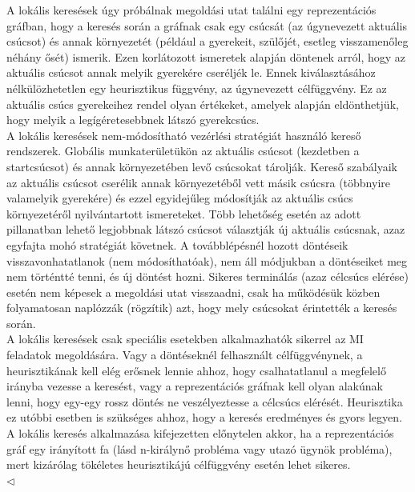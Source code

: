 \documentclass[12pt,margin=0px]{article}
\begin{document}
    {\footnotesize
    \noindent {\color{blue} \faLightbulbO\ $\triangleright$ }

    {\footnotesize
    \noindent A lokális keresések úgy próbálnak megoldási utat találni egy reprezentációs gráfban, hogy a keresés során a gráfnak csak egy csúcsát (az úgynevezett aktuális csúcsot) és annak környezetét (például a gyerekeit, szülőjét, esetleg visszamenőleg néhány ősét) ismerik. Ezen korlátozott ismeretek alapján döntenek arról, hogy az aktuális csúcsot annak melyik gyerekére cseréljék le. Ennek kiválasztásához nélkülözhetetlen egy heurisztikus függvény, az úgynevezett célfüggvény. Ez az aktuális csúcs gyerekeihez rendel olyan értékeket, amelyek alapján eldönthetjük, hogy melyik a legígéretesebbnek látszó gyerekcsúcs.
    }\\

    {\footnotesize
    \noindent A lokális keresések nem-módosítható vezérlési stratégiát használó kereső rendszerek. Globális munkaterületükön az aktuális csúcsot (kezdetben a startcsúcsot) és annak környezetében levő csúcsokat tárolják. Kereső szabályaik az aktuális csúcsot cserélik annak környezetéből vett másik csúcsra (többnyire valamelyik gyerekére) és ezzel egyidejűleg módosítják az aktuális csúcs környezetéről nyilvántartott ismereteket. Több lehetőség esetén az adott pillanatban lehető legjobbnak látszó csúcsot választják új aktuális csúcsnak, azaz egyfajta mohó stratégiát követnek. A továbblépésnél hozott döntéseik visszavonhatatlanok (nem módosíthatóak), nem áll módjukban a döntéseiket meg nem történtté tenni, és új döntést hozni. Sikeres terminálás (azaz célcsúcs elérése) esetén nem képesek a megoldási utat visszaadni, csak ha működésük közben folyamatosan naplózzák (rögzítik) azt, hogy mely csúcsokat érintették a keresés során.
    }\\

    {\footnotesize
    \noindent A lokális keresések csak speciális esetekben alkalmazhatók sikerrel az MI feladatok megoldására. Vagy a döntéseknél felhasznált célfüggvénynek, a heurisztikának kell elég erősnek lennie ahhoz, hogy csalhatatlanul a megfelelő irányba vezesse a keresést, vagy a reprezentációs gráfnak kell olyan alakúnak lenni, hogy egy-egy rossz döntés ne veszélyeztesse a célcsúcs elérését. Heurisztika ez utóbbi esetben is szükséges ahhoz, hogy a keresés eredményes és gyors legyen.
    }\\

    {\footnotesize
    \noindent A lokális keresés alkalmazása kifejezetten előnytelen akkor, ha a reprezentációs gráf egy irányított fa (lásd n-királynő probléma vagy utazó ügynök probléma), mert kizárólag tökéletes heurisztikájú célfüggvény esetén lehet sikeres.
    }\\
    $\triangleleft$ \faLightbulbO}
\end{document}
